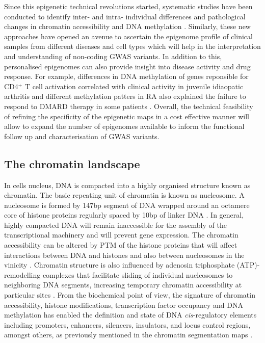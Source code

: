 Since this epigenetic technical revolutions started, systematic studies have been conducted to identify inter- and intra- individual differences and pathological changes in chromatin accessibility and DNA methylation \parencite{Qu2015,Corces2016,Liu2013. Add other ATAC}. Similarly, these new approaches have opened an avenue to ascertain the epigenome profile of clinical samples from different diseases and cell types which will help in the interpretation and understanding of non-coding GWAS variants. In addition to this, personalised epigenomes can also provide insight into disease activity and drug response. For example, differences in DNA methylation of genes reponsible for CD4$^+$ T cell activation correlated with clinical activity in juvenile idiaopatic arthritis and different methylation patters in RA also explained the failure to respond to DMARD therapy in some patients \parencite{Spreafico2016,Glossop2017}. Overall, the technical feasibility of refining the specificity of the epigenetic maps in a cost effective manner will allow to expand the number of epigenomes available to inform the functional follow up and characterisation of GWAS variants.


\subsection{The chromatin landscape}
In cells nucleus, DNA is compacted into a highly organised structure known as chromatin. The basic repeating unit of chromatin is known as nucleosome. A nucleosome is formed by 147bp segment of DNA wrapped around an octamere core of histone proteins regularly spaced by 10bp of linker DNA \parencite{Luger1997}. In general, highly compacted DNA will remain inaccessible for the assembly of the transcriptional machinery and will prevent gene expression. The chromatin accessibility can be altered by PTM of the histone proteins that will affect interactions between DNA and histones and also between nucleosomes in the vinicity \parencite{Polach2000,Pepenella2014}. Chromatin structure is also influenced by adenosin triphosphate (ATP)-remodelling complexes that facilitate sliding of individual nucleosomes to neighboring DNA segments, increasing temporary chromatin accessibility at particular sites \parencite{Cosma1999}. From the biochemical point of view, the signature of chromatin accessibility, histone modifications, transcription factor occupancy and DNA methylation has enabled the definition and state of DNA \textit{cis}-regulatory elements including promoters, enhancers, silencers, insulators, and locus control regions, amongst others, as previously mentioned in the chromatin segmentation maps \parencite{Boyle2012,ref from chomatin segmentation}.




